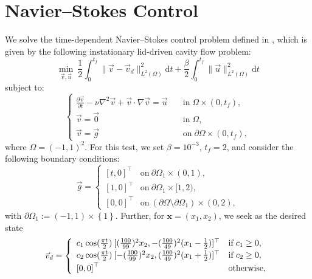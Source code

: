 \documentclass[letterpaper,10pt,english]{sphinxmanual}
\begin{document}
\section{Navier--Stokes Control}
We solve the time-dependent Navier--Stokes control problem defined in
	\cite[Section\,6.3]{Leveque_Pearson_2022}, which is given by the
	following instationary lid-driven cavity flow problem:
	\begin{displaymath}
		\min_{\vec{v}, \vec{u}} ~ \frac{1}{2} \int_0^{t_f} \| \vec{v} - \vec{v}_d
		\|^2_{L^2(\Omega)} \mathrm{d} t + \frac{\beta}{2} \int_0^{t_f} 
		\| \vec{u} \|^2_{L^2(\Omega)} \mathrm{d} t
	\end{displaymath}
	subject to:
	\begin{displaymath}
		\left\{
			\begin{array}{ll}
				\frac{\partial \vec{v}}{\partial t} - \nu \nabla^2 \vec{v} +
				\vec{v} \cdot \nabla \vec{v} = \vec{u} & \quad \mathrm{in} \;
					\Omega \times (0, t_f),\\
				\vec{v}=\vec{0} & \quad \mathrm{in} \; \Omega,\\
				\vec{v}=\vec{g} & \quad \mathrm{on} \;
					\partial \Omega \times(0, t_f),
			\end{array}
		\right.
	\end{displaymath}
	where $\Omega = (-1,1)^2$. For this test, we set $\beta=10^{-3}$, $t_f=2$,
	and consider the following boundary conditions:
	\begin{displaymath}
		\vec{g} =
		\left\{
			\begin{array}{ll}
				\left[t,0\right]^\top & \mathrm{on} \: \partial \Omega_1
					\times (0,1),\\
				\left[1,0\right]^\top & \mathrm{on} \: \partial \Omega_1
					\times [1,2),\\
				\left[0,0\right]^\top & \mathrm{on} \: (\partial \Omega
					\setminus \partial\Omega_1) \times (0,2),
			\end{array}
		\right.
	\end{displaymath}
	with $\partial \Omega_1:= (-1,1) \times \left\{1\right\}$. Further, for
	$\mathbf{x}=(x_1,x_2)$, we seek as the desired state
	\begin{displaymath}
		\vec{v}_d =
		\left\{
			\begin{array}{ll}
				\vspace{0.5ex}
				c_1 \cos(\frac{\pi t}{2}) \: [(\frac{100}{99})^2 x_2,
					-(\frac{100}{49})^2 (x_1-\frac{1}{2})]^\top
				& \mathrm{if} \: c_1 \geq 0,\\
				\vspace{0.5ex}
				c_2 \cos(\frac{\pi t}{2}) \: [-(\frac{100}{99})^2 x_2,
					(\frac{100}{49})^2 (x_1+\frac{1}{2})]^\top
				& \mathrm{if} \: c_2 \geq 0,\\
				\left[0,0\right]^\top & \mathrm{otherwise},
			\end{array}
		\right.
	\end{displaymath}
\end{document}
